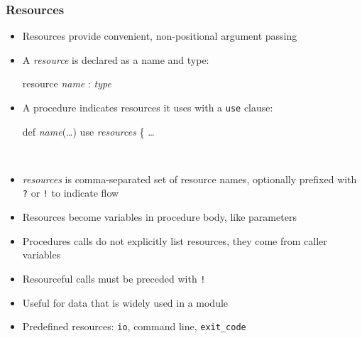 \documentclass[12pt]{beamer}
\begin{document}
\begin{frame}[fragile]
\frametitle{Resources}
\begin{itemize}
\item Resources provide convenient, non-positional argument passing
\item A \emph{resource} is declared as a name and type: \\[-1ex]
  \begin{minipage}{0.95\linewidth}
    \begin{block}{}
\begin{semiverbatim}
resource \emph{name} : \emph{type}
\end{semiverbatim}
    \end{block}
  \end{minipage}
\item A procedure indicates resources it uses with a \texttt{use}
  clause:
\\[-1ex]
  \begin{minipage}{0.95\linewidth}
    \begin{block}{}
\begin{semiverbatim}
def \emph{name}(\ldots) \alert{use \emph{resources}} \{ \ldots
\end{semiverbatim}
    \end{block}
  \end{minipage} \\[1ex]
\item \emph{resources} is comma-separated set of resource names,
  optionally prefixed with \texttt{?} or \texttt{!} to indicate flow
\item Resources become variables in procedure body, like parameters
\item Procedures calls do not explicitly list resources, they come from caller
  variables
\item Resourceful calls must be preceded with \texttt{!}
\item Useful for data that is widely used in a module
\item Predefined resources:  \texttt{io}, command line, \texttt{exit\_code}
\end{itemize}
\end{frame}
\end{document}
